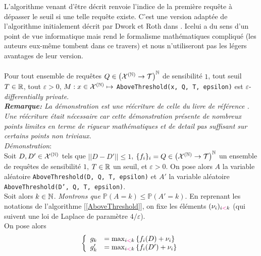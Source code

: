L'algorithme venant d'être décrit renvoie l'indice de la première requête à dépasser le seuil si une telle requête existe. C'est une version adaptée de l'algorithme initialement décrit par {\sc Dwork } et {\sc Roth} dans \cite[page 57]{dwork2014the}. Icelui a du sens d'un point de vue informatique mais rend le formalisme mathématiques compliqué (les auteurs eux-même tombent dans ce travers) et nous n'utiliseront pas les légers avantages de leur version.\\
 
\theoreme{}\\
Pour tout ensemble de requêtes \(Q \in \left( \mathcal X^{(\mathbb{N})} \to  \mathcal T \right)^{\mathbb{N}}\) de sensibilité \(1\), tout seuil \(T \in \mathbb{R}\), tout \(\varepsilon > 0\), \(M : x \in \mathcal X^{(\mathbb{N})} \mapsto \) \texttt{AboveThreshold(x, Q, T, epsilon)} est \(\varepsilon\)-\textit{differentially private}.\\

\textit{\textbf{Remarque:} La démonstration est une réécriture de celle du livre de référence \cite[page57]{dwork2014the}. Une réécriture était nécessaire car cette démonstration présente de nombreux points limites en terme de rigueur mathématiques et de detail pas suffisant sur certains points non triviaux.}\\ 

\textit{Démonstration}:\\
Soit \(D, D' \in \mathcal X^{(\mathbb{N})}\) tels que \(||D - D'|| \leq 1\), \(\{f_i\}_i = Q \in \left( \mathcal X^{(\mathbb{N})} \to  \mathcal T \right)^{\mathbb{N}}\) un ensemble de requêtes de sensibilité \(1\), \(T \in \mathbb{R}\) un seuil, et \(\varepsilon > 0\). On pose alors \(A\) la variable aléatoire \texttt{AboveThreshold(D, Q, T, epsilon)} et \(A'\) la variable aléatoire \texttt{AboveThreshold(D', Q, T, epsilon)}.\\

Soit alors \(k \in \mathbb{N}\). \textit{Montrons que \(\mathbb P (A = k) \leq \mathbb P(A' = k)\)}. En reprenant les notations de l'algorithme [\ref{AboveThreshold}], on fixe les éléments \((\nu_i)_{i {\color{magenta} <} k}\) (qui suivent une loi de {\sc Laplace} de paramètre \(4/\varepsilon\)).\\


On pose alors
\[
    \left\{ 
        \begin{array}[]{rl}
            g_k & = \max_{i {\color{magenta} <} k} \left\{ f_i(D) + \nu_i\right\}\\
            g_k' & = \max_{i {\color{magenta} <} k} \left\{ f_i(D') + \nu_i\right\}\\
        \end{array}
    \right.    
\]

